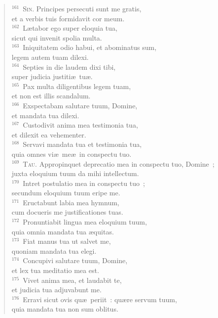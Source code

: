 \begin{flushleft}
\begin{verse}
${}^{161}$~\textsc{Sin.} Principes persecuti sunt me gratis,\\ et a verbis tuis formidavit cor meum.\\
${}^{162}$~L\ae tabor ego super eloquia tua,\\ sicut qui invenit spolia multa.\\
${}^{163}$~Iniquitatem odio habui, et abominatus sum,\\ legem autem tuam dilexi.\\
${}^{164}$~Septies in die laudem dixi tibi,\\ super judicia justiti\ae\ tu\ae .\\
${}^{165}$~Pax multa diligentibus legem tuam,\\ et non est illis scandalum.\\
${}^{166}$~Exspectabam salutare tuum, Domine,\\ et mandata tua dilexi.\\
${}^{167}$~Custodivit anima mea testimonia tua,\\ et dilexit ea vehementer.\\
${}^{168}$~Servavi mandata tua et testimonia tua,\\ quia omnes vi\ae\ me\ae\ in conspectu tuo.\\
${}^{169}$~\textsc{Tau.} Appropinquet deprecatio mea in conspectu tuo, Domine~;\\ juxta eloquium tuum da mihi intellectum.\\
${}^{170}$~Intret postulatio mea in conspectu tuo~;\\ secundum eloquium tuum eripe me.\\
${}^{171}$~Eructabunt labia mea hymnum,\\ cum docueris me justificationes tuas.\\
${}^{172}$~Pronuntiabit lingua mea eloquium tuum,\\ quia omnia mandata tua \ae quitas.\\
${}^{173}$~Fiat manus tua ut salvet me,\\ quoniam mandata tua elegi.\\
${}^{174}$~Concupivi salutare tuum, Domine,\\ et lex tua meditatio mea est.\\
${}^{175}$~Vivet anima mea, et laudabit te,\\ et judicia tua adjuvabunt me.\\
${}^{176}$~Erravi sicut ovis qu\ae\ periit~: qu\ae re servum tuum,\\ quia mandata tua non sum oblitus.\end{verse}\end{flushleft}


